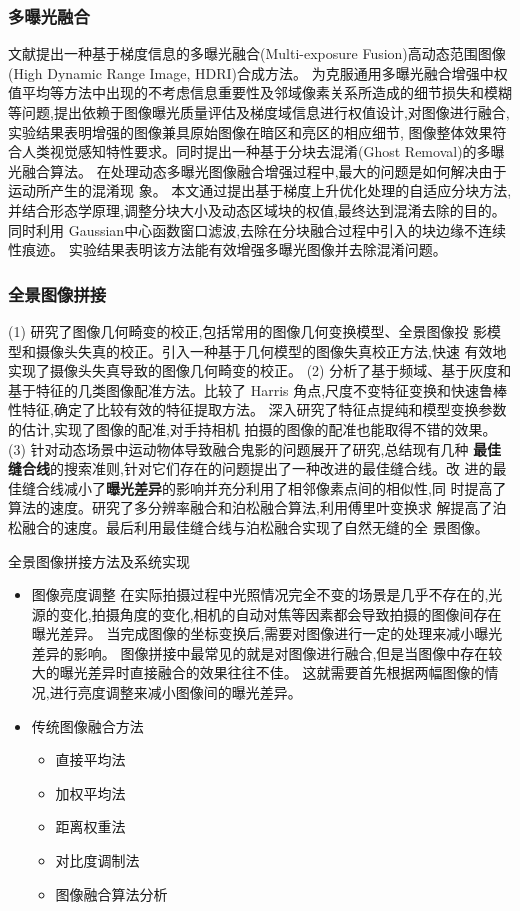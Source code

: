 \documentclass{amsart}
\begin{document}
\subsubsection{多曝光融合}
\label{sec:0203}

文献\cite{李艳梅}提出一种基于梯度信息的多曝光融合(Multi-exposure Fusion)高动态范围图像(High Dynamic Range Image, HDRI)合成方法。
为克服通用多曝光融合增强中权值平均等方法中出现的不考虑信息重要性及邻域像素关系所造成的细节损失和模糊等问题,提出依赖于图像曝光质量评估及梯度域信息进行权值设计,对图像进行融合,实验结果表明增强的图像兼具原始图像在暗区和亮区的相应细节,
图像整体效果符合人类视觉感知特性要求。同时提出一种基于分块去混淆(Ghost Removal)的多曝光融合算法。
在处理动态多曝光图像融合增强过程中,最大的问题是如何解决由于运动所产生的混淆现
象。
本文通过提出基于梯度上升优化处理的自适应分块方法,并结合形态学原理,调整分块大小及动态区域块的权值,最终达到混淆去除的目的。
同时利用 Gaussian中心函数窗口滤波,去除在分块融合过程中引入的块边缘不连续性痕迹。
实验结果表明该方法能有效增强多曝光图像并去除混淆问题。

\subsubsection{全景图像拼接}
\label{sec:0204}
\cite{赵书睿}
(1) 研究了图像几何畸变的校正,包括常用的图像几何变换模型、全景图像投
影模型和摄像头失真的校正。引入一种基于几何模型的图像失真校正方法,快速
有效地实现了摄像头失真导致的图像几何畸变的校正。
(2) 分析了基于频域、基于灰度和基于特征的几类图像配准方法。比较了 Harris
角点,尺度不变特征变换和快速鲁棒性特征,确定了比较有效的特征提取方法。
深入研究了特征点提纯和模型变换参数的估计,实现了图像的配准,对手持相机
拍摄的图像的配准也能取得不错的效果。
(3) 针对动态场景中运动物体导致融合鬼影的问题展开了研究,总结现有几种
\textbf{最佳缝合线}的搜索准则,针对它们存在的问题提出了一种改进的最佳缝合线。改
进的最佳缝合线减小了\textbf{曝光差异}的影响并充分利用了相邻像素点间的相似性,同
时提高了算法的速度。研究了多分辨率融合和泊松融合算法,利用傅里叶变换求
解提高了泊松融合的速度。最后利用最佳缝合线与泊松融合实现了自然无缝的全
景图像。

全景图像拼接方法及系统实现
\begin{itemize}
\item 图像亮度调整
在实际拍摄过程中光照情况完全不变的场景是几乎不存在的,光源的变化,拍摄角度的变化,相机的自动对焦等因素都会导致拍摄的图像间存在曝光差异。
当完成图像的坐标变换后,需要对图像进行一定的处理来减小曝光差异的影响。
图像拼接中最常见的就是对图像进行融合,但是当图像中存在较大的曝光差异时直接融合的效果往往不佳。
这就需要首先根据两幅图像的情况,进行亮度调整来减小图像间的曝光差异。
\item 传统图像融合方法
  \begin{itemize}
  \item 直接平均法
  \item 加权平均法
  \item 距离权重法
  \item 对比度调制法
  \item 图像融合算法分析
  \end{itemize}
\end{itemize}
\end{document}
